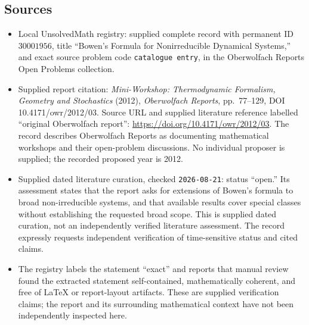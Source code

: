 \documentclass[11pt]{article}
\begin{document}
\subsection{Sources}
\begin{itemize}
\item Local UnsolvedMath registry: supplied complete record with permanent ID \(30001956\), title ``Bowen's Formula for Nonirreducible Dynamical Systems,'' and exact source problem code \texttt{catalogue entry}, in the Oberwolfach Reports Open Problems collection.
\item Supplied report citation: \emph{Mini-Workshop: Thermodynamic Formalism, Geometry and Stochastics} (2012), \emph{Oberwolfach Reports}, pp.\ 77--129, DOI 10.4171/owr/2012/03. Source URL and supplied literature reference labelled ``original Oberwolfach report'': \url{https://doi.org/10.4171/owr/2012/03}. The record describes Oberwolfach Reports as documenting mathematical workshops and their open-problem discussions. No individual proposer is supplied; the recorded proposed year is 2012.
\item Supplied dated literature curation, checked \texttt{2026-08-21}: status ``open.'' Its assessment states that the report asks for extensions of Bowen's formula to broad non-irreducible systems, and that available results cover special classes without establishing the requested broad scope. This is supplied dated curation, not an independently verified literature assessment. The record expressly requests independent verification of time-sensitive status and cited claims.
\item The registry labels the statement ``exact'' and reports that manual review found the extracted statement self-contained, mathematically coherent, and free of LaTeX or report-layout artifacts. These are supplied verification claims; the report and its surrounding mathematical context have not been independently inspected here.
\end{itemize}
\end{document}
